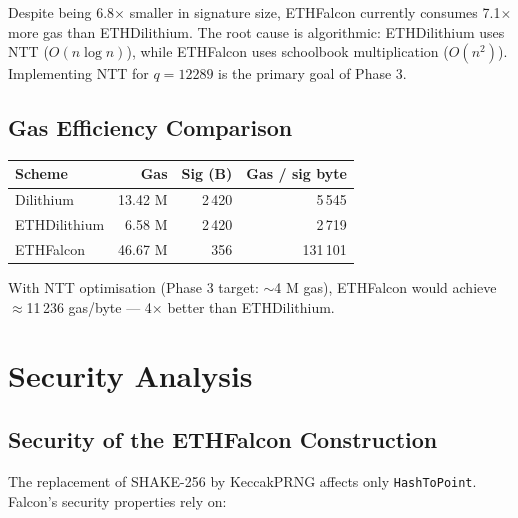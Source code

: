 \documentclass[11pt,a4paper]{article}
\begin{document}
\begin{warningbox}[Context]
Despite being 6.8$\times$ smaller in signature size, ETHFalcon currently
consumes 7.1$\times$ more gas than ETHDilithium.
The root cause is algorithmic: ETHDilithium uses NTT ($O(n\log n)$),
while ETHFalcon uses schoolbook multiplication ($O(n^2)$).
Implementing NTT for $q=12289$ is the primary goal of Phase 3.
\end{warningbox}

\subsection{Gas Efficiency Comparison}

\begin{center}
\begin{tabular}{lrrr}
\toprule
Scheme & Gas & Sig (B) & Gas / sig byte \\
\midrule
Dilithium    & 13.42 M & 2\,420 & 5\,545 \\
ETHDilithium &  6.58 M & 2\,420 & 2\,719 \\
ETHFalcon    & 46.67 M &    356 & 131\,101 \\
\bottomrule
\end{tabular}
\end{center}

With NTT optimisation (Phase 3 target: $\sim$4 M gas), ETHFalcon would achieve
$\approx$11\,236 gas/byte --- 4$\times$ better than ETHDilithium.

\section{Security Analysis}

\subsection{Security of the ETHFalcon Construction}

The replacement of SHAKE-256 by KeccakPRNG affects only \texttt{HashToPoint}.
Falcon's security properties rely on:
\end{document}

